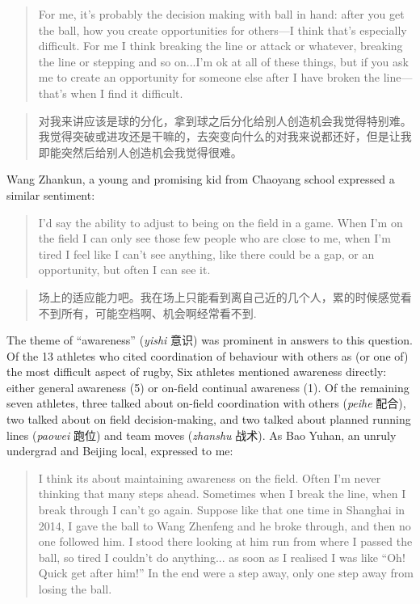 \begin{CJK}{UTF8}{gbsn}
\begin{quotation}
  For me, it's probably the decision making with ball in hand: after you get the ball, how you create opportunities for others---I think that's especially difficult.  For me I think breaking the line or attack or whatever, breaking the line or stepping and so on...I'm ok at all of these things, but if you ask me to create an opportunity for someone else after I have broken the line---that's when I find it difficult.
\end{quotation}

\begin{quotation}
  对我来讲应该是球的分化，拿到球之后分化给别人创造机会我觉得特别难。我觉得突破或进攻还是干嘛的，去突变向什么的对我来说都还好，但是让我即能突然后给别人创造机会我觉得很难。
\end{quotation}

Wang Zhankun, a young and promising kid from Chaoyang school expressed a similar sentiment:

\begin{quotation}
  I’d say the ability to adjust to being on the field in a game.  When I’m on the field I can only see those few people who are close to me, when I’m tired I feel like I can’t see anything, like there could be a gap, or an opportunity, but often I can see it.
\end{quotation}

\begin{quotation}
  场上的适应能力吧。我在场上只能看到离自己近的几个人，累的时候感觉看不到所有，可能空档啊、机会啊经常看不到.
\end{quotation}

The theme of ``awareness'' (\textit{yishi} 意识) was prominent in answers to this question. Of the 13 athletes who cited coordination of behaviour with others as (or one of) the most difficult aspect of rugby,  Six athletes mentioned awareness directly: either general awareness (5) or on-field continual awareness (1).  Of the remaining seven athletes, three talked about on-field coordination with others (\textit{peihe} 配合), two talked about on field decision-making, and two talked about planned running lines (\textit{paowei} 跑位) and team moves (\textit{zhanshu} 战术). As Bao Yuhan, an unruly undergrad and Beijing local, expressed to me:

  \begin{quotation}
    I think its about maintaining awareness on the field. Often I'm never thinking that many steps ahead.  Sometimes when I break the line, when I break through I can't go again. Suppose like that one time in Shanghai in 2014, I gave the ball to Wang Zhenfeng and he broke through, and then no one followed him.  I stood there looking at him run from where I passed the ball, so tired I couldn't do anything... as soon as I realised I was like ``Oh! Quick get after him!'' In the end were a step away, only one step away from losing the ball.
  \end{quotation}


\end{CJK}
